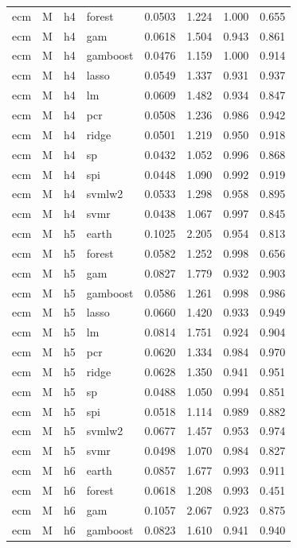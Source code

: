 \begin{ThreePartTable}
\begin{longtable}[t]{llclcccc}
ecm & M & h4 & forest & 0.0503 & 1.224 & 1.000 & 0.655\\
ecm & M & h4 & gam & 0.0618 & 1.504 & 0.943 & 0.861\\
ecm & M & h4 & gamboost & 0.0476 & 1.159 & 1.000 & 0.914\\
ecm & M & h4 & lasso & 0.0549 & 1.337 & 0.931 & 0.937\\
ecm & M & h4 & lm & 0.0609 & 1.482 & 0.934 & 0.847\\
ecm & M & h4 & pcr & 0.0508 & 1.236 & 0.986 & 0.942\\
ecm & M & h4 & ridge & 0.0501 & 1.219 & 0.950 & 0.918\\
ecm & M & h4 & sp & 0.0432 & 1.052 & 0.996 & 0.868\\
ecm & M & h4 & spi & 0.0448 & 1.090 & 0.992 & 0.919\\
ecm & M & h4 & svmlw2 & 0.0533 & 1.298 & 0.958 & 0.895\\
ecm & M & h4 & svmr & 0.0438 & 1.067 & 0.997 & 0.845\\
\addlinespace
ecm & M & h5 & earth & 0.1025 & 2.205 & 0.954 & 0.813\\
ecm & M & h5 & forest & 0.0582 & 1.252 & 0.998 & 0.656\\
ecm & M & h5 & gam & 0.0827 & 1.779 & 0.932 & 0.903\\
ecm & M & h5 & gamboost & 0.0586 & 1.261 & 0.998 & 0.986\\
ecm & M & h5 & lasso & 0.0660 & 1.420 & 0.933 & 0.949\\
ecm & M & h5 & lm & 0.0814 & 1.751 & 0.924 & 0.904\\
ecm & M & h5 & pcr & 0.0620 & 1.334 & 0.984 & 0.970\\
ecm & M & h5 & ridge & 0.0628 & 1.350 & 0.941 & 0.951\\
ecm & M & h5 & sp & 0.0488 & 1.050 & 0.994 & 0.851\\
ecm & M & h5 & spi & 0.0518 & 1.114 & 0.989 & 0.882\\
ecm & M & h5 & svmlw2 & 0.0677 & 1.457 & 0.953 & 0.974\\
ecm & M & h5 & svmr & 0.0498 & 1.070 & 0.984 & 0.827\\
\addlinespace
ecm & M & h6 & earth & 0.0857 & 1.677 & 0.993 & 0.911\\
ecm & M & h6 & forest & 0.0618 & 1.208 & 0.993 & 0.451\\
ecm & M & h6 & gam & 0.1057 & 2.067 & 0.923 & 0.875\\
ecm & M & h6 & gamboost & 0.0823 & 1.610 & 0.941 & 0.940\\

\end{longtable}
\end{ThreePartTable}
